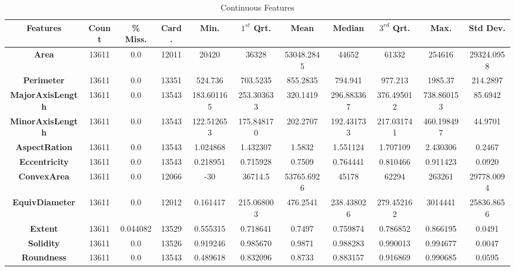 \documentclass[10pt, conference]{IEEEtran}
\begin{document}
\begin{table}[h!]
    \caption{Continuous Features}
    \begin{center}
    \begin{tabular}{|c||c|c|c|c|c|c|c|c|c|c|}
        \hline
        \textbf{Features}&\textbf{Count}&\textbf{\% Miss.}&\textbf{Card.}&\textbf{Min.}&\textbf{$1^{st}$ Qrt.}&\textbf{Mean}&\textbf{Median}&\textbf{$3^{rd}$ Qrt.}&\textbf{Max}.&\textbf{Std Dev.}\\
        \hline
        \textbf{Area}               &13611  &0.0       &12011   &20420      &36328      &53048.2845 &44652      &61332      &254616     &29324.0958\\
        \textbf{Perimeter}          &13611  &0.0       &13351   &524.736    &703.5235   &855.2835   &794.941    &977.213    &1985.37    &214.2897\\
        \textbf{MajorAxisLength}    &13611  &0.0       &13543   &183.601165 &253.303633 &320.1419   &296.883367 &376.495012 &738.860153 &85.6942\\
        \textbf{MinorAxisLength}    &13611  &0.0       &13543   &122.512653 &175.848170	&202.2707   &192.431733 &217.031741 &460.198497 &44.9701\\
        \textbf{AspectRation}       &13611  &0.0       &13543   &1.024868   &1.432307   &1.5832     &1.551124   &1.707109	  &2.430306   &0.2467\\
        \textbf{Eccentricity}       &13611  &0.0       &13543   &0.218951   &0.715928   &0.7509     &0.764441	  &0.810466	  &0.911423   &0.0920\\
        \textbf{ConvexArea}         &13611  &0.0       &12066   &-30        &36714.5    &53765.6926 &45178      &62294      &263261     &29778.0094\\
        \textbf{EquivDiameter}      &13611  &0.0       &12012   &0.161417   &215.068003 &476.2541   &238.438026 &279.452162 &3014441    &25836.8656\\
        \textbf{Extent}             &13611  &0.044082  &13529   &0.555315   &0.718641   &0.7497     &0.759874   &0.786852	  &0.866195	  &0.0491\\
        \textbf{Solidity}           &13611  &0.0       &13526   &0.919246	&0.985670	&0.9871     &0.988283   &0.990013   &0.994677   &0.0047	\\
        \textbf{Roundness}          &13611  &0.0       &13543   &0.489618   &0.832096   &0.8733     &0.883157   &0.916869   &0.990685   &0.0595\\

\end{tabular}
\end{center}
\end{table}
\end{document}
